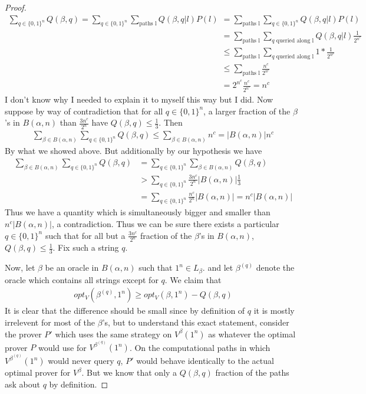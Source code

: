 \documentclass{article}
\theoremstyle{definition}
\theoremstyle{plain}
\theoremstyle{theorem}
\begin{document}
\begin{proof}
\begin{align}
		\sum_{q \in \{0,1\}^n}Q(\beta,q) = \sum_{q \in \{0,1\}^n} \sum_{\textrm{paths l}} Q(\beta,q|l)P(l) &=\sum_{\textrm{paths l}}\sum_{q \in \{0,1\}^n}Q(\beta,q|l)P(l) \\ &= \sum_{\textrm{paths l}}\sum_{q \textrm{ queried along l}}Q(\beta,q|l)\frac{1}{2^{n^c}} \\
		&\leq \sum_{\textrm{paths l}} \sum_{q \textrm{ queried along l}} 1 * \frac{1}{2^{n^c}} \\
		&\leq \sum_{\textrm{paths l}} \frac{n^c}{2^{n^c}} \\
		& = 2^{n^c}\frac{n^c}{2^{n^c}} = n^c
	\end{align} 	
	I don't know why I needed to explain it to myself this way but I did. Now suppose by way of contradiction that for all $q \in \{0,1\}^n$, a larger fraction of the $\beta$'s in $B(\alpha,n)$ than $\frac{3n^c}{2^n}$ have $Q(\beta,q) \leq \frac{1}{3}$. Then
	\begin{align}
		\sum_{\beta \in B(\alpha,n)} \sum_{q \in \{0,1\}^n} Q(\beta,q) \leq \sum_{\beta \in B(\alpha,n)}n^c = |B(\alpha,n)|n^c
	\end{align}
	By what we showed above. But additionally by our hypothesis we have 
	\begin{align}
		\sum_{\beta \in B(\alpha,n)} \sum_{q \in \{0,1\}^n} Q(\beta,q) &= \sum_{q \in \{0,1\}^n} \sum_{\beta \in B(\alpha,n)} Q(\beta,q) \\
		&> \sum_{q \in \{0,1\}^n} \frac{3n^c}{2^n}|B(\alpha,n)|\frac{1}{3} \\
		&= \sum_{q \in \{0,1\}^n} \frac{n^c}{2^n}|B(\alpha,n)| = n^c|B(\alpha,n)|
	\end{align}
	Thus we have a quantity which is simultaneously bigger and smaller than $n^c|B(\alpha,n)|$, a contradiction. Thus we can be sure there exists a particular $q \in \{0,1\}^n$ such that for all but a $\frac{3n^c}{2^n}$ fraction of the $\beta$'s in $B(\alpha,n)$, $Q(\beta,q) \leq \frac{1}{3}$. Fix such a string $q$. \par 
	Now, let $\beta$ be an oracle in $B(\alpha,n)$ such that $1^n \in L_{\beta}$. and let $\beta^{(q)}$ denote the oracle which contains all strings except for $q$. We claim that 
	\begin{align}
		opt_V(\beta^{(q)},1^n) \geq opt_V(\beta,1^n)-Q(\beta,q)
	\end{align}
	It is clear that the difference should be small since by definition of $q$ it is mostly irrelevent for most of the $\beta$'s, but to understand this exact statement, consider the prover $P'$ which uses the same strategy on $V^{\beta}(1^n)$ as whatever the optimal prover $P$ would use for $V^{\beta^{(q)}}(1^n)$. On the computational paths in which $V^{\beta^{(q)}}(1^n)$ would never query $q$, $P'$ would behave identically to the actual optimal prover for $V^{\beta}$. But we know that only a $Q(\beta,q)$ fraction of the paths ask about $q$ by definition. 

\end{proof}
\end{document}
